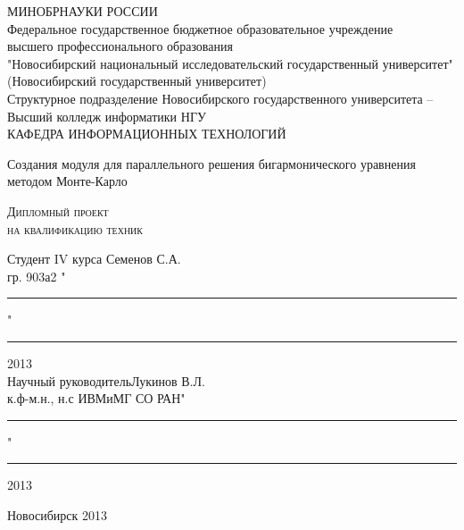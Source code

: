 \begin{titlepage}

\begin{center}
МИНОБРНАУКИ РОССИИ\\
Федеральное государственное бюджетное образовательное учреждение\\
высшего профессионального образования \\
\hspace{-10mm}"Новосибирский национальный исследовательский государственный университет"\\
(Новосибирский государственный университет)\\
\hspace{-7mm}Структурное подразделение Новосибирского государственного университета -- \\
Высший колледж информатики НГУ\\
КАФЕДРА ИНФОРМАЦИОННЫХ ТЕХНОЛОГИЙ
\end{center}


\vspace{8em}

\begin{center}
\Large Создания модуля для параллельного решения бигармонического уравнения методом Монте-Карло 
\end{center}

\vspace{2.5em}

\begin{center}
\textsc{Дипломный проект\\ на квалификацию техник }
\end{center}

\vspace{6em}

\begin{flushleft}
 Студент IV курса \hfill Семенов С.А. \\
гр. 903а2 \hfill "\rule{3ex}{0,1mm}"\rule{10ex}{0,1mm}2013 \\
\vspace{1.5em}
Научный руководитель\hfill Лукинов В.Л.\\
к.ф-м.н., н.с ИВМиМГ СО РАН\hfill "\rule{3ex}{0,1mm}"\rule{10ex}{0,1mm}2013 \\
\end{flushleft}

\vspace{\fill}
\begin{center}
Новосибирск 2013
\end{center}
\end{titlepage}

